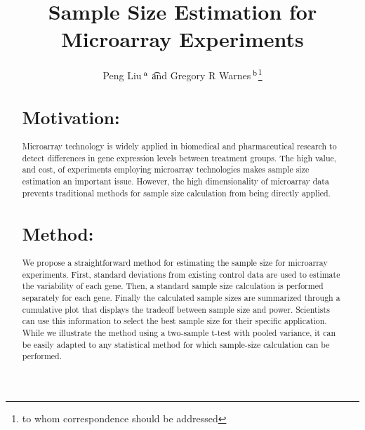 \documentclass{bioinfo}
\begin{document}

\title{Sample Size Estimation for Microarray Experiments}
\author{
  Peng Liu\,$^{\rm a}$ \t
  and
  Gregory R Warnes\,$^{\rm b}$\footnote{to whom correspondence should
    be addressed}
}
\address{
  $^{\rm a}$Department of Biological Statistics and Computational
  Biology, Cornell University, Ithaca, NY 14853 \\
  $^{\rm b}$Nonclinical Statistics, Pfizer Global Research and Development,
  Groton, CT 06340
}

\maketitle

\begin{abstract}

\section{Motivation:}
Microarray technology is widely applied in biomedical and
pharmaceutical research to detect differences in gene expression
levels between treatment groups.  The high value, and cost, of
experiments employing microarray technologies makes sample size
estimation an important issue.  However, the high dimensionality of
microarray data prevents traditional methods for sample size
calculation from being directly applied.

\section{Method:}
We propose a straightforward method for estimating the sample size
for microarray experiments. First, standard deviations from
existing control data are used to estimate the variability of each
gene. Then, a standard sample size calculation is performed
separately for each gene.  Finally the calculated sample sizes are
summarized through a cumulative plot that displays the tradeoff
between sample size and power.  Scientists can use this
information to select the best sample size for their specific
application.  While we illustrate the method using a two-sample
t-test with pooled variance, it can be easily adapted to any
statistical method for which sample-size calculation can be
performed.


\end{abstract}
\end{document}
